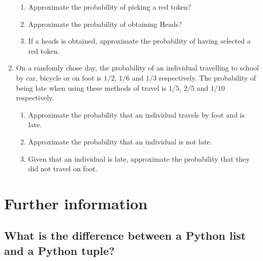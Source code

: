 \begin{enumerate}
\begin{enumerate}
\item 

Approximate the probability of picking a red token?

\item 

Approximate the probability of obtaining Heads?

\item 

If a heads is obtained, approximate the probability of having selected a red token.

\end{enumerate}

\item 

On a randomly chose day, the probability of an individual travelling to school by car, bicycle or on foot is \(1/2\), \(1/6\) and \(1/3\) respectively. The probability of being late when using these methods of travel is \(1/5\), \(2/5\) and \(1/10\) respectively.
\begin{enumerate}

\item 

Approximate the probability that an individual travels by foot and is late.

\item 

Approximate the probability that an individual is not late.

\item 

Given that an individual is late, approximate the probability that they did not travel on foot.

\end{enumerate}

\end{enumerate}


\section{Further information}
\label{\detokenize{tools-for-mathematics/06-probability/why/main:further-information}}\label{\detokenize{tools-for-mathematics/06-probability/why/main::doc}}

\subsection{What is the difference between a Python list and a Python tuple?}
\label{sec:what_is_the_difference_between_a_python_list_and_a_python_tuple}

